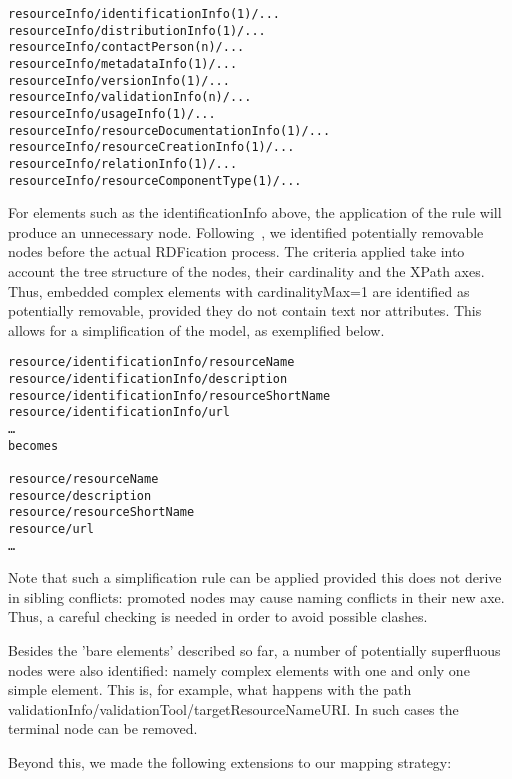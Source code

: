 \documentclass{llncs}
\begin{document}
{\footnotesize
\begin{verbatim}
resourceInfo/identificationInfo(1)/...
resourceInfo/distributionInfo(1)/... 
resourceInfo/contactPerson(n)/...
resourceInfo/metadataInfo(1)/... 
resourceInfo/versionInfo(1)/... 
resourceInfo/validationInfo(n)/...
resourceInfo/usageInfo(1)/...
resourceInfo/resourceDocumentationInfo(1)/...
resourceInfo/resourceCreationInfo(1)/...
resourceInfo/relationInfo(1)/...
resourceInfo/resourceComponentType(1)/...
\end{verbatim}}


For elements such as the identificationInfo above, the application of the rule will produce an unnecessary node. Following~\cite{Villegas2014}, we identified potentially removable nodes before the actual RDFication process. The criteria applied take into account the tree structure of the nodes, their cardinality and the XPath axes. Thus, embedded complex elements with cardinalityMax=1 are identified as potentially removable, provided they do not contain text nor attributes. This allows for a simplification of the model, as exemplified below.

{\footnotesize
\begin{verbatim}
resource/identificationInfo/resourceName
resource/identificationInfo/description
resource/identificationInfo/resourceShortName
resource/identificationInfo/url
…
becomes

resource/resourceName
resource/description
resource/resourceShortName
resource/url
…
\end{verbatim}}


Note that such a simplification rule can be applied provided this does not derive in sibling conflicts: promoted nodes may cause naming conflicts in their new axe. Thus, a careful checking is needed in order to avoid possible clashes.

Besides the 'bare elements' described so far, a number of potentially superfluous nodes were also identified: namely complex elements with one and only one simple element. This is, for example, what happens with the path validationInfo/validationTool/targetResourceNameURI. In such cases the terminal node can be removed.



Beyond this, we made the following extensions to our mapping strategy:
\end{document}
